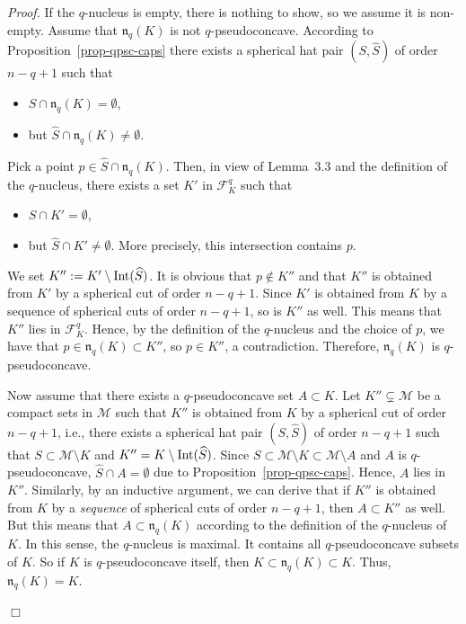 \documentclass[11pt,a4paper]{article}
\newenvironment{proof}{\noindent\textit{Proof. }}{\hfill $\Box$\linebreak}
\renewcommand{\SS}{\mathbb{S}}
\newcommand{\Fcal}{\mathcal{F}}
\newcommand{\Mcal}{\mathcal{M}}
\newcommand{\nuc}{\mathfrak{n}}
\newcommand{\Int}{\hbox{Int}}
\begin{document}
\begin{proof} If the $q$-nucleus is empty, there is nothing to show, so we assume it is non-empty. Assume that $\nuc_q(K)$ is not $q$-pseudoconcave. 
According to Proposition~\ref{prop-qpsc-caps} there exists a spherical hat pair $(S,\widehat{S})$ of order $n{-}q{+}1$ such that

\begin{itemize}

\item $S \cap \nuc_q(K)=\emptyset$,

\item but $\widehat{S} \cap \nuc_q(K) \neq \emptyset$.

\end{itemize}

Pick a point $p \in \widehat{S} \cap \nuc_q(K)$. Then, in view of Lemma~3.3 and the definition of the $q$-nucleus, there exists a set $K'$ in $\Fcal_K^q$ such that

\begin{itemize}

\item $S \cap K'=\emptyset$,

\item but $\widehat{S} \cap K' \neq \emptyset$. More precisely, this intersection contains $p$.

\end{itemize}

We set $K'':= K' \setminus \Int(\widehat{S})$. It is obvious that $p \notin K''$ and that $K''$ is obtained from $K'$ by a spherical cut of order $n{-}q{+}1$. Since $K'$ is obtained from $K$ by a sequence of spherical cuts of order $n{-}q{+}1$, so is $K''$ as well. This means that $K''$ lies in $\Fcal_K^q$. Hence, by the definition of the $q$-nucleus and the choice of $p$, we have that $p \in \nuc_q(K) \subset K''$, so $p \in K''$, a contradiction. Therefore, $\nuc_q(K)$ is $q$-pseudoconcave.

Now assume that there exists a $q$-pseudoconcave set $A \subset K$. Let $K''\subsetneq\Mcal$ be a compact sets in $\Mcal$ such that $K''$ is obtained from $K$ by a spherical cut of order $n{-}q{+}1$, i.e., there exists a spherical hat pair $(S,\widehat{S})$ of order $n{-}q{+}1$ such that $S \subset \Mcal\setminus K$ and $K''=K \setminus \Int(\widehat{S})$. Since $S \subset \Mcal\setminus K \subset \Mcal\setminus A$ and $A$ is $q$-pseudoconcave, $\widehat{S} \cap A = \emptyset$ due to Proposition~\ref{prop-qpsc-caps}. Hence, $A$ lies in $K''$. Similarly, by an inductive argument, we can derive that if $K''$ is obtained from $K$ by a \emph{sequence} of spherical cuts of order $n{-}q{+}1$, then $A \subset K''$ as well. But this means that $A \subset \nuc_q(K)$ according to the definition of the $q$-nucleus of $K$. In this sense, the $q$-nucleus is maximal. It contains all $q$-pseudoconcave subsets of $K$. So if $K$ is $q$-pseudoconcave itself, then $K \subset \nuc_q(K) \subset K$. Thus, $\nuc_q(K)=K$.


\end{proof}
\end{document}
